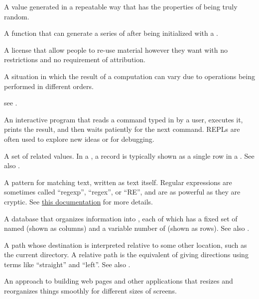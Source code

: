 \begin{description}
A value generated in a repeatable way that has the properties of being truly
random.

A function that can generate a series of  after being initialized with a
.

A license that allow people to re-use material however they want
with no restrictions and no requirement of attribution.

A situation in which the result of a computation can vary due to operations
being performed in different orders.

see .

An interactive program that reads a command typed in by a user, executes it,
prints the result, and then waits patiently for the next command. REPLs are
often used to explore new ideas or for debugging.

A set of related values. In a ,
a record is typically shown as a single row in a . See also
.

A pattern for matching text, written as text itself. Regular expressions
are sometimes called ``regexp'', ``regex'', or ``RE'', and are as powerful as
they are cryptic.
See \href{https://developer.mozilla.org/en-US/docs/Web/JavaScript/Guide/Regular_Expressions}{this documentation}
for more details.

A database that organizes information into , each of which
has a fixed set of named  (shown as columns) and a variable
number of  (shown as rows). See also .

A path whose destination is interpreted relative to some other location, such
as the current directory. A relative path is the equivalent of giving
directions using terms like ``straight'' and ``left''. See also .

An approach to building web pages and other applications that resizes and
reorganizes things smoothly for different sizes of screens.


\end{description}
